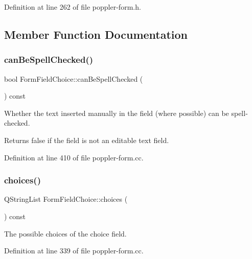Definition at line 262 of file poppler-\/form.\+h.



\subsection{Member Function Documentation}
\mbox{\label{class_poppler_1_1_form_field_choice_aedb493804f55f2d08c412dd7ce50b3b1}} 
\subsubsection{\texorpdfstring{can\+Be\+Spell\+Checked()}{canBeSpellChecked()}}
{\footnotesize\ttfamily bool Form\+Field\+Choice\+::can\+Be\+Spell\+Checked (\begin{DoxyParamCaption}{ }\end{DoxyParamCaption}) const}

Whether the text inserted manually in the field (where possible) can be spell-\/checked. \begin{DoxyVerb}Returns false if the field is not an editable text field.\end{DoxyVerb}
 

Definition at line 410 of file poppler-\/form.\+cc.

\mbox{\label{class_poppler_1_1_form_field_choice_aa773d5afb0a53a2c8df6f2bb61a2def5}} 
\subsubsection{\texorpdfstring{choices()}{choices()}}
{\footnotesize\ttfamily Q\+String\+List Form\+Field\+Choice\+::choices (\begin{DoxyParamCaption}{ }\end{DoxyParamCaption}) const}

The possible choices of the choice field. 

Definition at line 339 of file poppler-\/form.\+cc.


